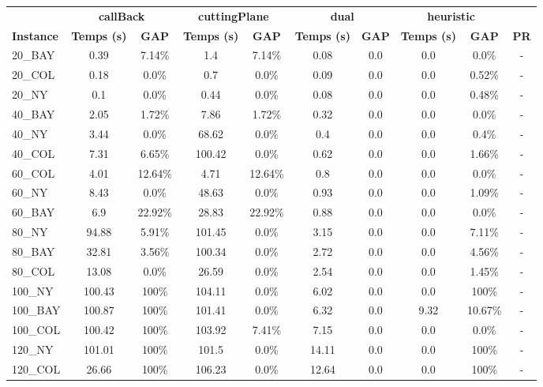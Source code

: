 \documentclass[main.tex]{subfiles}
\begin{document}
\begin{center}
\renewcommand{\arraystretch}{1.4} 
\begin{tabular}{lccccccccc}
	\hline
 & \multicolumn{2}{c}{\textbf{callBack}} & \multicolumn{2}{c}{\textbf{cuttingPlane}} & \multicolumn{2}{c}{\textbf{dual}} & \multicolumn{2}{c}{\textbf{heuristic}}\\
\textbf{Instance}  & \textbf{Temps (s)} & \textbf{GAP} & \textbf{Temps (s)} & \textbf{GAP} & \textbf{Temps (s)} & \textbf{GAP} & \textbf{Temps (s)} & \textbf{GAP} & \textbf{PR} \\\hline

20\_BAY & 0.39 & 7.14\% & 1.4 & 7.14\% & 0.08 & 0.0 & 0.0 & 0.0\% & - \\
20\_COL & 0.18 & 0.0\% & 0.7 & 0.0\% & 0.09 & 0.0 & 0.0 & 0.52\% & - \\
20\_NY & 0.1 & 0.0\% & 0.44 & 0.0\% & 0.08 & 0.0 & 0.0 & 0.48\% & - \\
40\_BAY & 2.05 & 1.72\% & 7.86 & 1.72\% & 0.32 & 0.0 & 0.0 & 0.0\% & - \\
40\_NY & 3.44 & 0.0\% & 68.62 & 0.0\% & 0.4 & 0.0 & 0.0 & 0.4\% & - \\
40\_COL & 7.31 & 6.65\% & 100.42 & 0.0\% & 0.62 & 0.0 & 0.0 & 1.66\% & - \\
60\_COL & 4.01 & 12.64\% & 4.71 & 12.64\% & 0.8 & 0.0 & 0.0 & 0.0\% & - \\
60\_NY & 8.43 & 0.0\% & 48.63 & 0.0\% & 0.93 & 0.0 & 0.0 & 1.09\% & - \\
60\_BAY & 6.9 & 22.92\% & 28.83 & 22.92\% & 0.88 & 0.0 & 0.0 & 0.0\% & - \\
80\_NY & 94.88 & 5.91\% & 101.45 & 0.0\% & 3.15 & 0.0 & 0.0 & 7.11\% & - \\
80\_BAY & 32.81 & 3.56\% & 100.34 & 0.0\% & 2.72 & 0.0 & 0.0 & 4.56\% & - \\
80\_COL & 13.08 & 0.0\% & 26.59 & 0.0\% & 2.54 & 0.0 & 0.0 & 1.45\% & - \\
100\_NY & 100.43 &  100\%  & 104.11 & 0.0\% & 6.02 & 0.0 & 0.0 &  100\%  & - \\
100\_BAY & 100.87 &  100\%  & 101.41 & 0.0\% & 6.32 & 0.0 & 9.32 & 10.67\% & - \\
100\_COL & 100.42 &  100\%  & 103.92 & 7.41\% & 7.15 & 0.0 & 0.0 & 0.0\% & - \\
120\_NY & 101.01 &  100\%  & 101.5 & 0.0\% & 14.11 & 0.0 & 0.0 &  100\%  & - \\
120\_COL & 26.66 &  100\%  & 106.23 & 0.0\% & 12.64 & 0.0 & 0.0 &  100\%  & - \\

\end{tabular}
\end{center}
\end{document}
